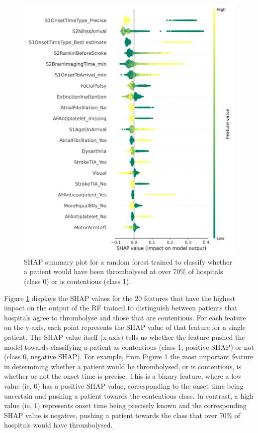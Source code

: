 \documentclass[12pt,a4paper, pdftex]{elsarticle}
\begin{document}
\begin{figure}[ht!!]
\centering
\includegraphics[width=12cm]{figures/shap_beeswarm.jpg}
\caption{SHAP summary plot for a random forest trained to classify whether a patient would have been thrombolysed at over 70\% of hospitals (class 0) or is contentious (class 1).}
\label{fig:shap_beeswarm}
\end{figure}

Figure \ref{fig:shap_beeswarm} displays the SHAP values for the 20 features that have the highest impact on the output of the RF trained to distinguish between patients that hospitals agree to thrombolyse and those that are contentious. For each feature on the y-axis, each point represents the SHAP value of that feature for a single patient. The SHAP value itself (x-axis) tells us whether the feature pushed the model towards classifying a patient as contentious (class 1, positive SHAP) or not (class 0, negative SHAP). For example, from Figure \ref{fig:shap_beeswarm} the most important feature in determining whether a patient would be thrombolysed, or is contentious, is whether or not the onset time is precise. This is a binary feature, where a low value (ie, 0) has a positive SHAP value, corresponding to the onset time being uncertain and pushing a patient towards the contentious class. In contrast, a high value (ie, 1) represents onset time being precisely known and the corresponding SHAP value is negative, pushing a patient towards the class that over 70\% of hospitals would have thrombolysed.
\end{document}
